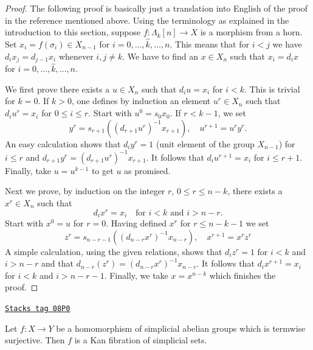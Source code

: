 \begin{proof}
The following proof is basically just a translation into English
of the proof in the reference mentioned above.
Using the terminology as explained in the introduction to this section,
suppose $f : \Lambda_k[n] \to X$ is a morphism from a horn. Set
$x_i = f(\sigma_i) \in X_{n - 1}$ for $i = 0, \ldots, \hat k, \ldots, n$.
This means that for $i < j$ we have $d_i x_j = d_{j - 1} x_i$
whenever $i, j \not = k$.
We have to find an $x \in X_n$ such that $x_i = d_ix$ for
$i = 0, \ldots, \hat k, \ldots, n$.

\medskip\noindent
We first prove there exists a $u \in X_n$ such that $d_i u = x_i$
for $i < k$. This is trivial for $k = 0$. If $k > 0$, one defines by
induction an element $u^r \in X_n$ such that $d_i u^r = x_i$ for
$0 \leq i \leq r$. Start with $u^0 = s_0x_0$. If $r < k - 1$,
we set
$$
y^r = s_{r + 1}((d_{r + 1}u^r)^{-1}x_{r + 1}),\quad
u^{r + 1} = u^r y^r.
$$
An easy calculation shows that $d_iy^r = 1$ (unit element of the group
$X_{n - 1}$) for $i \leq r$ and
$d_{r + 1}y^r = (d_{r + 1}u^r)^{-1}x_{r + 1}$. It follows that
$d_iu^{r + 1} = x_i$ for $i \leq r + 1$. Finally, take $u = u^{k - 1}$
to get $u$ as promised.

\medskip\noindent
Next we prove, by induction on the integer $r$, $0 \leq r \leq n - k$,
there exists a $x^r \in X_n$ such that
$$
d_i x^r = x_i\quad\text{for }i < k\text{ and }i > n - r.
$$
Start with $x^0 = u$ for $r = 0$. Having defined $x^r$ for $r \leq n - k - 1$
we set
$$
z^r = s_{n - r - 1}((d_{n - r}x^r)^{-1}x_{n - r}),\quad x^{r + 1} = x^rz^r
$$
A simple calculation, using the given relations, shows that
$d_iz^r = 1$ for $i < k$ and $i > n - r$ and that
$d_{n - r}(z^r) = (d_{n - r}x^r)^{-1}x_{n - r}$. It follows that
$d_ix^{r + 1} = x_i$ for $i < k$ and $i > n - r - 1$. Finally, we
take $x = x^{n - k}$ which finishes the proof.
\end{proof}

\begin{lemma}
\label{simplicial-lemma-surjection-simplicial-abelian-groups-kan}
\href{https://stacks.math.columbia.edu/tag/08P0}{\texttt{Stacks tag 08P0}}

Let $f : X \to Y$ be a homomorphism of simplicial abelian groups
which is termwise surjective. Then $f$ is a Kan fibration of
simplicial sets.
\end{lemma}

